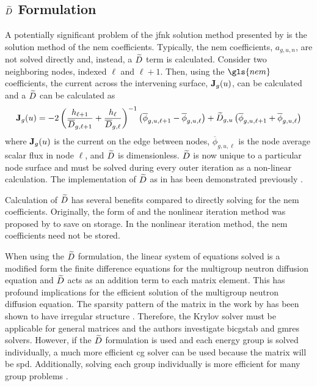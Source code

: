   \subsection{\texorpdfstring{$\widetilde{D}$ Formulation}{D\textasciitilde \ Formulation}}
    \label{sec:dtilde_formulation}
    A potentially significant problem of the \gls{jfnk} solution method 
    presented by \citeauthor{qe2paper} is the solution method of the \gls{nem}
    coefficients. Typically, the \gls{nem} coefficients, $a_{g,u,n}$, are not
    solved directly and, instead, a $\widetilde{D}$ term is calculated. Consider two
    neighboring nodes, indexed $\ell$ and $\ell+1$. Then, using the $\gls{nem}$
    coefficients, the current across the intervening surface, $\mathbf{J}_g(u)$, 
    can be calculated and a $\widetilde{D}$ can be calculated as
    \begin{equation}
      \label{eq:dtilde}
      \mathbf{J}_g(u) = 
        -2 \left( \frac{h_{\ell+1}}{\overline{D}_{g,\ell+1}} + 
          \frac{h_{\ell}}{\overline{D}_{g,\ell}} \right)^{-1}
          \left( \overline{\phi}_{g,u,\ell+1} -
          \overline{\phi}_{g,u,\ell} \right) + 
        \widetilde{D}_{g,u} \left( \overline{\phi}_{g,u,\ell+1} +
          \overline{\phi}_{g,u,\ell} \right)
    \end{equation}
    where $\mathbf{J}_g(u)$ is the current on the edge between nodes,
    $\overline{\phi}_{g,u,\ell}$ is the node average scalar flux in node $\ell$,
    and $\widetilde{D}$ is dimensionless. $\widetilde{D}$ is now unique to a particular node
    surface and must be solved during every outer iteration as a non-linear
    calculation. The implementation of $\widetilde{D}$ as in  has been
    demonstrated previously \cite{smith_nonlinear,palmtagThesis}.

    Calculation of $\widetilde{D}$ has several benefits compared to directly solving
    for the \gls{nem} coefficients. Originally, the form of  and
    the nonlinear iteration method was proposed by \citeauthor{smith_nonlinear}
    to save on storage. In the nonlinear iteration method, the \gls{nem}
    coefficients need not be stored.

    When using the $\widetilde{D}$ formulation, the linear system of equations solved
    is a modified form the finite difference equations for the multigroup
    neutron diffusion equation and $\widetilde{D}$ acts as an addition term to each
    matrix element. This has profound implications for the efficient solution of
    the multigroup neutron diffusion equation. The sparsity pattern of the
    matrix in the work by \citeauthor{qe2paper} has been shown to have irregular
    structure \cite{palmtagThesis}. Therefore, the Krylov solver must be
    applicable for general matrices and the authors investigate \gls{bicgstab}
    and \gls{gmres} solvers. However, if the $\widetilde{D}$ formulation is used and
    each energy group is solved individually, a much more efficient \gls{cg}
    solver can be used because the matrix will be \gls{spd}. Additionally,
    solving each group individually is more efficient for many group problems
    \cite{my_ms_thesis}.

